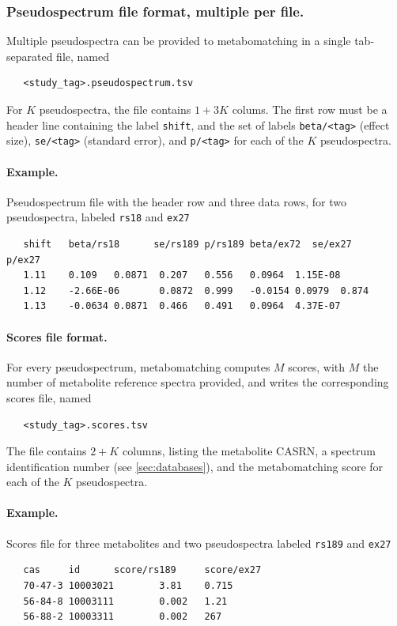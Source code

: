 \documentclass[a4paper,11pt]{article}
\begin{document}
\subsubsection{Pseudospectrum file format, multiple per file.}
Multiple pseudospectra can be provided to metabomatching in a single tab-separated file, named
\begin{verbatim}
   <study_tag>.pseudospectrum.tsv
\end{verbatim}
For $K$ pseudospectra, the file contains $1+3K$ colums. The first row must be a header line containing the label \verb|shift|, and the set of labels \verb|beta/<tag>| (effect size), \verb|se/<tag>| (standard error), and \verb|p/<tag>| for each of the $K$ pseudospectra.
\paragraph{Example.} Pseudospectrum file with the header row and three data rows, for two pseudospectra, labeled \verb|rs18| and \verb|ex27|
\begin{verbatim}
   shift   beta/rs18      se/rs189 p/rs189 beta/ex72  se/ex27    p/ex27
   1.11    0.109   0.0871  0.207   0.556   0.0964  1.15E-08
   1.12    -2.66E-06       0.0872  0.999   -0.0154 0.0979  0.874
   1.13    -0.0634 0.0871  0.466   0.491   0.0964  4.37E-07
\end{verbatim}
\paragraph{Scores file format.} For every pseudospectrum, metabomatching computes $M$ scores, with $M$ the number of metabolite reference spectra provided, and writes the corresponding scores file, named 
\begin{verbatim}
   <study_tag>.scores.tsv
\end{verbatim}
The file contains $2+K$ columns, listing the metabolite CASRN, a spectrum identification number (see \ref{sec:databases}), and the metabomatching score for each of the $K$ pseudospectra.
\paragraph{Example.} Scores file for three metabolites and two pseudospectra labeled \verb|rs189| and \verb|ex27|
\begin{verbatim}
   cas     id      score/rs189     score/ex27
   70-47-3 10003021        3.81    0.715
   56-84-8 10003111        0.002   1.21
   56-88-2 10003311        0.002   267
\end{verbatim}
\end{document}
